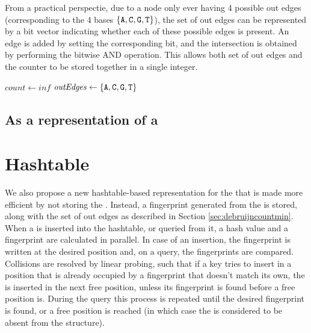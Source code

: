 From a practical perspectie, due to a node only ever having 4 possible out edges (corresponding to the 4 bases $\{\mathtt{A}, \mathtt{C}, \mathtt{G}, \mathtt{T}\}$),
the set of out edges can be represented by a bit vector indicating whether each of these possible edges is present. An edge is added
by setting the corresponding bit, and the intersection is obtained by performing the bitwise AND operation. This allows both set of
out edges and the counter to be stored together in a single integer.

\begin{algorithm}
    \caption{$\mathit{query}(\text{k-mer})$}\label{alg:query}
    $\mathit{count} \gets \mathit{inf}$\;
    $\mathit{outEdges} \gets \{\mathtt{A}, \mathtt{C}, \mathtt{G}, \mathtt{T}\}$\;
\end{algorithm}

\subsection{As a representation of a \dBG}

\section{Hashtable}
\label{sec:debruijnhashtable}

We also propose a new hashtable-based representation for the \dBG that is made more efficient by not storing the \kmer. Instead,
a fingerprint generated from the \kmer is stored, along with the set of out edges as described in Section \ref{sec:debruijncountmin}.
When a \kmer is inserted into the hashtable, or queried from it, a hash value and a fingerprint are calculated in parallel.
In case of an insertion, the fingerprint is written at the desired position and, on a query, the fingerprints are compared. Collisions
are resolved by linear probing, such that if a key tries to insert in a position that is already occupied by a fingerprint that doesn't 
match its own, the \kmer is inserted in the next free position, unless its fingerprint is found before a free position is. During the
query this process is repeated until the desired fingerprint is found, or a free position is reached (in which case the \kmer is
considered to be absent from the structure).

